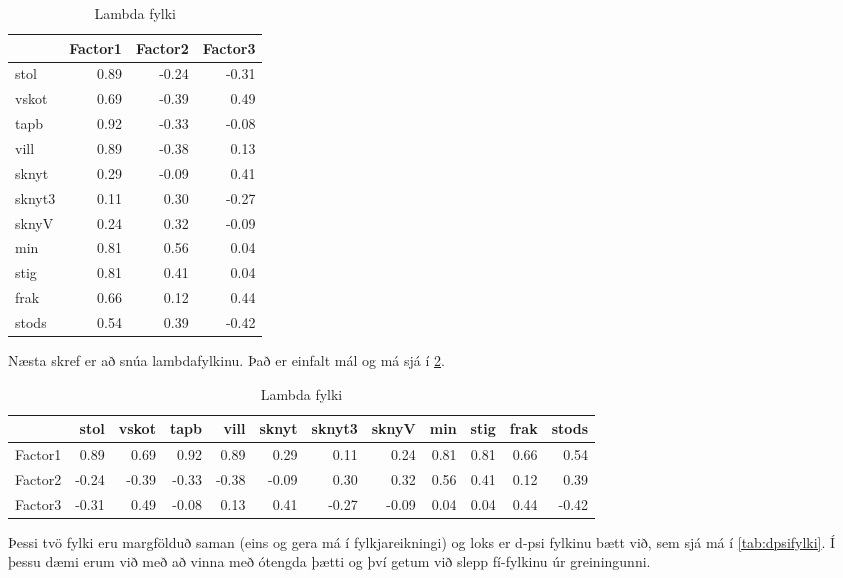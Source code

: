 \documentclass[]{book}
\begin{document}
\begin{table}

\caption{\label{tab:lambdafylki}Lambda fylki}
\centering
\begin{tabular}[t]{l|r|r|r}
\hline
  & Factor1 & Factor2 & Factor3\\
\hline
stol & 0.89 & -0.24 & -0.31\\
\hline
vskot & 0.69 & -0.39 & 0.49\\
\hline
tapb & 0.92 & -0.33 & -0.08\\
\hline
vill & 0.89 & -0.38 & 0.13\\
\hline
sknyt & 0.29 & -0.09 & 0.41\\
\hline
sknyt3 & 0.11 & 0.30 & -0.27\\
\hline
sknyV & 0.24 & 0.32 & -0.09\\
\hline
min & 0.81 & 0.56 & 0.04\\
\hline
stig & 0.81 & 0.41 & 0.04\\
\hline
frak & 0.66 & 0.12 & 0.44\\
\hline
stods & 0.54 & 0.39 & -0.42\\
\hline
\end{tabular}
\end{table}

Næsta skref er að snúa lambdafylkinu. Það er einfalt mál og má sjá í \ref{tab:snuidlambdafylki}.

\begin{table}

\caption{\label{tab:snuidlambdafylki}Lambda fylki}
\centering
\begin{tabular}[t]{l|r|r|r|r|r|r|r|r|r|r|r}
\hline
  & stol & vskot & tapb & vill & sknyt & sknyt3 & sknyV & min & stig & frak & stods\\
\hline
Factor1 & 0.89 & 0.69 & 0.92 & 0.89 & 0.29 & 0.11 & 0.24 & 0.81 & 0.81 & 0.66 & 0.54\\
\hline
Factor2 & -0.24 & -0.39 & -0.33 & -0.38 & -0.09 & 0.30 & 0.32 & 0.56 & 0.41 & 0.12 & 0.39\\
\hline
Factor3 & -0.31 & 0.49 & -0.08 & 0.13 & 0.41 & -0.27 & -0.09 & 0.04 & 0.04 & 0.44 & -0.42\\
\hline
\end{tabular}
\end{table}

Þessi tvö fylki eru margfölduð saman (eins og gera má í fylkjareikningi) og loks er d-psi fylkinu bætt við, sem sjá má í \ref{tab:dpsifylki}. Í þessu dæmi erum við með að vinna með ótengda þætti og því getum við slepp fí-fylkinu úr greiningunni.
\end{document}
